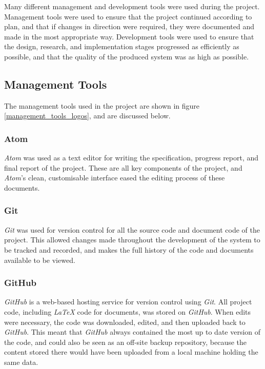 
Many different management and development tools were used during the project. Management tools were used to ensure that the project continued according to plan, and that if changes in direction were required, they were documented and made in the most appropriate way. Development tools were used to ensure that the design, research, and implementation stages progressed as efficiently as possible, and that the quality of the produced system was as high as possible.

\subsection{Management Tools}
\label{management_tools}
The management tools used in the project are shown in figure \ref{management_tools_logos}, and are discussed below.

\subsubsection{Atom \cite{atom}}
\textit{Atom} was used as a text editor for writing the specification, progress report, and final report of the project. These are all key components of the project, and \textit{Atom}'s clean, customisable interface eased the editing process of these documents.

\subsubsection{Git \cite{git}}
\textit{Git} was used for version control for all the source code and document code of the project. This allowed changes made throughout the development of the system to be tracked and recorded, and makes the full history of the code and documents available to be viewed.

\subsubsection{GitHub \cite{github}}
\textit{GitHub} is a web-based hosting service for version control using \textit{Git}. All project code, including \textit{LaTeX} code for documents, was stored on \textit{GitHub}. When edits were necessary, the code was downloaded, edited, and then uploaded back to \textit{GitHub}. This meant that \textit{GitHub} always contained the most up to date version of the code, and could also be seen as an off-site backup repository, because the content stored there would have been uploaded from a local machine holding the same data.

